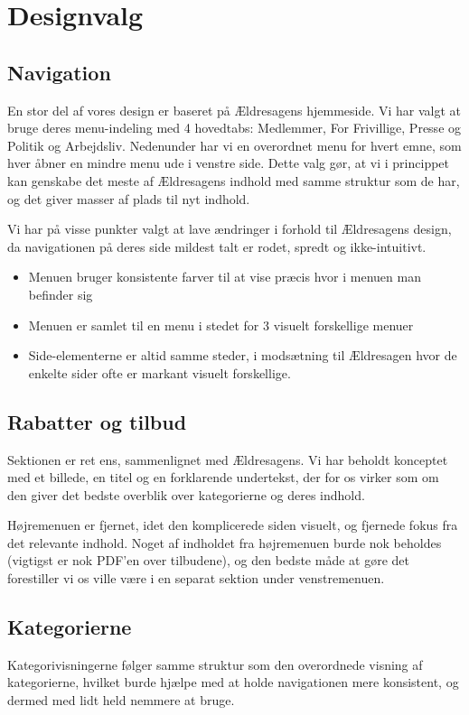 \section{Designvalg}
\subsection{Navigation}
En stor del af vores design er baseret på Ældresagens hjemmeside. Vi har
valgt at bruge deres menu-indeling med 4 hovedtabs: Medlemmer, For Frivillige,
Presse og Politik og Arbejdsliv. Nedenunder har vi en overordnet menu for hvert
emne, som hver åbner en mindre menu ude i venstre side. Dette valg gør, at vi i
princippet kan genskabe det meste af Ældresagens indhold med samme struktur som de
har, og det giver masser af plads til nyt indhold. 

Vi har på visse punkter valgt at lave ændringer i forhold til Ældresagens design, da
navigationen på deres side mildest talt er rodet, spredt og ikke-intuitivt. 

\begin{itemize}
\item Menuen bruger konsistente farver til at vise præcis hvor i menuen man befinder sig
\item Menuen er samlet til en menu i stedet for 3 visuelt forskellige menuer
\item Side-elementerne er altid samme steder, i modsætning til Ældresagen hvor de enkelte sider
      ofte er markant visuelt forskellige.
\end{itemize}

\subsection{Rabatter og tilbud}
Sektionen er ret ens, sammenlignet med Ældresagens. Vi har beholdt konceptet med et billede, en titel og en forklarende undertekst, der for os virker som om den giver det bedste overblik over kategorierne og deres indhold.

Højremenuen er fjernet, idet den komplicerede siden visuelt, og fjernede fokus fra det relevante indhold.
Noget af indholdet fra højremenuen burde nok beholdes (vigtigst er nok PDF'en over tilbudene), og den bedste måde at gøre det forestiller vi os ville være i en separat sektion under venstremenuen. 

\subsection{Kategorierne}
Kategorivisningerne følger samme struktur som den overordnede visning af kategorierne, hvilket burde hjælpe med at holde navigationen mere konsistent, og dermed med lidt held nemmere at bruge. 

